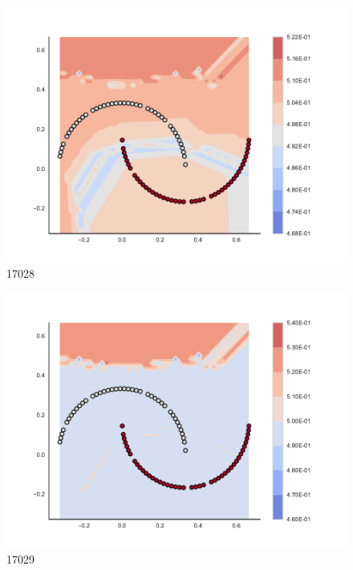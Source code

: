 \begin{subfigure}[b]{0.09\textwidth}
    \includegraphics[clip, trim=2.35cm 1.75cm 4.5cm 0cm,width=\textwidth]{img/convergence/17028.pdf}
    \caption{17028}
    \label{fig:convergence_17028}
\end{subfigure}
%
\begin{subfigure}[b]{0.09\textwidth}
    \includegraphics[clip, trim=2.35cm 1.75cm 4.5cm 0cm,width=\textwidth]{img/convergence/17029.pdf}
    \caption{17029}
    \label{fig:convergence_17029}
\end{subfigure}
%
